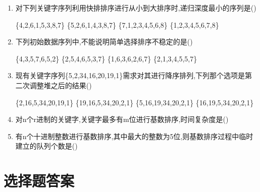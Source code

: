 \documentclass[12pt, a4paper, oneside, UTF8]{ctexbook}
\begin{document}
\begin{enumerate}
    \item 对下列关键字序列利用快排排序进行从小到大排序时,递归深度最小的序列是(\qquad)
    \begin{choices}[2]
        \task \{4,2,6,1,5,3,8,7\} \task \{5,2,6,1,4,3,8,7\}
        \task \{7,1,2,3,4,5,6,8\} \task \{1,2,3,4,5,6,7,8\}
    \end{choices}

    \item 下列初始数据序列中,不能说明简单选择排序不稳定的是(\qquad)
    \begin{choices}[2]
        \task \{4,3,5,7,6,5,2\} \task \{2,5,4,6,5,3,7\}
        \task \{1,6,3,6,2,6,7\} \task \{2,1,3,4,5,5,7\}
    \end{choices}

    \item 现有关键字序列\{5,2,34,16,20,19,1\}需求对其进行降序排列,下列那个选项是第二次调整堆之后的结果(\qquad)
    \begin{choices}[2]
        \task \{2,16,5,34,20,19,1\} \task \{19,16,5,34,20,2,1\}
        \task \{5,16,19,34,20,2,1\} \task \{16,19,5,34,20,2,1\}
    \end{choices}


    \item 对n个r进制的关键字,关键字最多有m位进行基数排序,时间复杂度是(\qquad)
    \item 有n个十进制整数进行基数排序,其中最大的整数为5位,则基数排序过程中临时建立的队列个数是(\qquad)
\end{enumerate}
\section{选择题答案}
\end{document}
